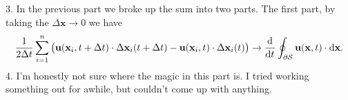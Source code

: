 \documentclass{article}
\def\*#1{\mathbf{#1}}
\newcommand{\fS}{\mathcal{S}} %
\begin{document}
3. In the previous part we broke up the sum into two parts. The first
   part, by taking the $\Delta \*x \to 0$ we have
%
\begin{equation*}
    \frac{1}{2 \Delta t} \sum_{i = 1}^n
        \del{
            \*u(\*x_i, t + \Delta t) \cdot \Delta \*x_i(t + \Delta t)
            - \*u(\*x_i, t) \cdot \Delta \*x_i(t)
        } \to \dod{}{t} \oint_{\partial \fS} \*u(\*x, t) \cdot \dif \*x
        .
\end{equation*}
%
4. I'm honestly not sure where the magic in this part is. I tried
   working something out for awhile, but couldn't come up with anything.
\end{document}
